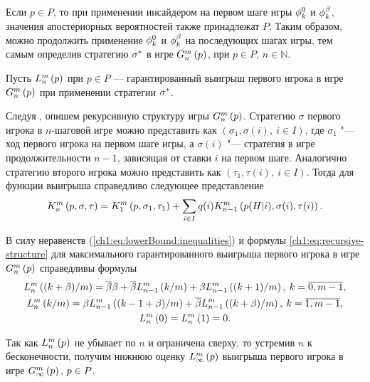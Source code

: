 {\begin{remark}
  \label{ch1:remark:posterior-probs}
  Если $p \in P$, то при применении инсайдером на первом шаге игры $\fEven$ и $\fOdd$, значения апостериорных вероятностей также принадлежат $P$.
  Таким образом, можно продолжить применение $\fEven$ и $\fOdd$ на последующих шагах игры, тем самым определив стратегию $\fOpt$ в игре $\generalGame{n}{p}$, при $p \in P, \, n \in \mathbb{N}$.
\end{remark}

Пусть $\lowerBound[n]{p}$ при $p \in P$ --- гарантированный выигрыш первого игрока в игре $\generalGame{n}{p}$ при применении стратегии $\fOpt$.

Следуя \cite{domansky07}, опишем рекурсивную структуру игры $\generalGame{n}{p}$.
Стратегию $\sigma$ первого игрока в $n$-шаговой игре можно представить как $(\sigma_1, \sigma(i),\ i \in I)$, где $\sigma_1$ "--- ход
первого игрока на первом шаге игры, а $\sigma(i)$ "--- стратегия в игре продолжительности $n-1$, зависящая от ставки $i$ на первом шаге.
Аналогично стратегию второго игрока можно представить как $(\tau_1, \tau(i),\ i \in I)$.
Тогда для функции выигрыша справедливо следующее представление
\begin{equation}
  \label{ch1:eq:recursive-structure}
  \firstPlayerPayoff{n}{p}{\sigma}{\tau} = 
  \firstPlayerPayoff{1}{p}{\sigma_1}{\tau_1} + 
  \sum_{i \in I} q(i) \firstPlayerPayoff{n-1}{p(H|i)}{\sigma(i)}{\tau(i)}.
\end{equation}

В силу неравенств (\ref{ch1:eq:lowerBound:inequalities}) и формулы \eqref{ch1:eq:recursive-structure} для максимального гарантированного выигрыша первого игрока в игре $\generalGame{n}{p}$ справедливы формулы
\begin{equation}
  \begin{gathered}
    \label{ch1:eq:lowerBound:recurrence:function}
    \lowerBound[n]{(k + \Co)/m} = \DCo\Co + \DCo\lowerBound[n-1]{k/m} +
    \Co\lowerBound[n-1]{(k + 1)/m}, \: k = \overline{0, m-1}, \\
    \lowerBound[n]{k/m} = \Co\lowerBound[n-1]{(k - 1 + \Co)/m} +
    \DCo\lowerBound[n-1]{(k + \Co)/m}, \: k = \overline{1, m-1}, \\
    \lowerBound[n]{0} = \lowerBound[n]{1} = 0.
  \end{gathered}
\end{equation}

Так как $\lowerBound[n]{p}$ не убывает по $n$ и ограничена сверху, то устремив $n$ к бесконечности, получим нижнюю оценку $\lowerBound{p}$ выигрыша первого игрока в игре $\infiniteGame{p}, \, p \in P$.

}
